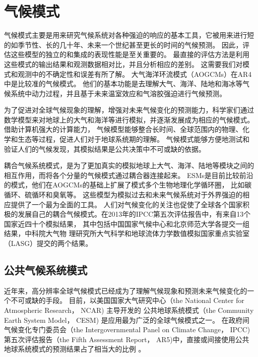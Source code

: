  
\section{气候模式}


气候模式主要是用来研究气候系统对各种强迫的响应的基本工具，它被用来进行短的如季节性、长的几十年、未来一个世纪甚至更长的时间的气候预测。 
因此，评估这些模型的独立的和集成的表现性能是至关重要的。
最直接的评估方法是利用这些模式的输出结果和观测数据相对比，并且分析相应的差别。 
这需要我们对模式和观测中的不确定性和误差有所了解。 
大气海洋环流模式（AOGCMs）在AR4中是比较准的气候模式。
他们的基本功能是去理解大气、海洋、陆地和海冰等气候系统中动力过程，并且基于未来温室效应和气溶胶强迫进行气候预测。

为了促进对全球气候现象的理解，增强对未来气候变化的预测能力，科学家们通过数学模型来对地球上的大气和海洋等进行模拟，并逐渐发展成为相应的气候模式。
借助计算机强大的计算能力， 气候模型能够整合长时间、全球范围内的物理、化学和生态等过程，促进人们对于地球系统期的理解\cite{hurrell2013community}。
气候模式能够方便地测试和验证人们的气候发现，其模拟结果是公共决策中不可或缺的依据。

耦合气候系统模式，是为了更加真实的模拟地球上大气、海洋、陆地等模块之间的相互作用，而将各个分量的气候模式通过耦合器连接起来。 
ESMs是目前比较前沿的模式，他们在AOGCMs的基础上扩展了模式多个生物地理化学循环圈， 比如碳循环、硫循环和臭氧等。
这些模型为模拟过去和未来气候系统对于外界强迫的相应提供了一个最为全面的工具。 
人们对气候变化的关注也促使了全球各个国家积极的发展自己的耦合气候模式。在2013年的IPCC第五次评估报告中，有来自13个国家近四十个模拟结果，
其中包括中国国家气候中心和北京师范大学各提交一组结果，中科院大气物
理研究所大气科学和地球流体力学数值模拟国家重点实验室（LASG）提交的两个结果\cite{stocker2013ipcc}。 




\cite{stocker2013ipcc}


\subsection{公共气候系统模式}
 
 
近年来，高分辨率全球气候模式已经成为了理解气候现象和预测未来气候变化的一个不可或缺的手段。 
目前，以美国国家大气研究中心（the National Center for Atmospheric Research， NCAR) 主导开发的
公共地球系统模式（the Community Earth System Model， CESM) 是应用最为广泛的全球气候模式之一。
在政府间气候变化专门委员会（the
Intergovernmental Panel on Climate Change， IPCC) 第五次评估报告（the Fifth Assessment
Report， AR5)中，直接或间接使用公共地球系统模式的预测结果占了相当大的比例 \cite{stocker2013ipcc}。
 

